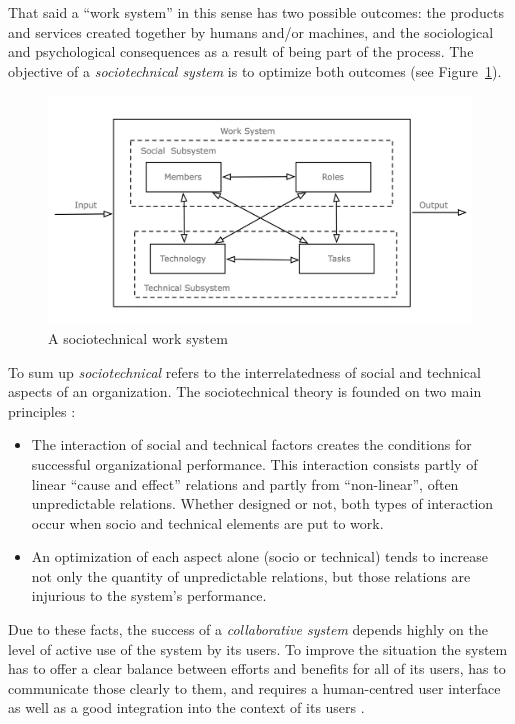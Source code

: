 That said a ``work system'' in this sense has two possible outcomes: the products and services created together by humans and/or machines, and the sociological and psychological consequences as a result of being part of the process. The objective of a \emph{sociotechnical system} is to optimize both outcomes (see Figure~\ref{fig:images_sociotechnical_system}). \@

\begin{figure}[H]
  \centering
  \includegraphics[width=0.9\columnwidth]{images/sociotechnical_system.png}
  \caption[A sociotechnical work system]{A sociotechnical work system \citep[pg. 29]{sydow1985}}
\label{fig:images_sociotechnical_system}
\end{figure}

To sum up \emph{sociotechnical} refers to the interrelatedness of social and technical aspects of an organization. The sociotechnical theory is founded on two main principles \citep{Koch2008}: \@

\begin{itemize}
  \item The interaction of social and technical factors creates the conditions for successful organizational performance. This interaction consists partly of linear ``cause and effect'' relations and partly from ``non-linear'', often unpredictable relations. Whether designed or not, both types of interaction occur when socio and technical elements are put to work.
  \item An optimization of each aspect alone (socio or technical) tends to increase not only the quantity of unpredictable relations, but those relations are injurious to the system's performance.
\end{itemize}

Due to these facts, the success of a \emph{collaborative system} depends highly on the level of active use of the system by its users. To improve the situation the system has to offer a clear balance between efforts and benefits for all of its users, has to communicate those clearly to them, and requires a human-centred user interface as well as a good integration into the context of its users \citep{Koch2008}.

